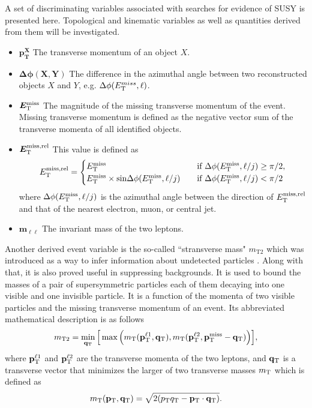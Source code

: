 A set of discriminating variables associated with searches for evidence of SUSY is presented here. Topological and kinematic variables as well as quantities derived from them will be investigated.

\begin{itemize}[leftmargin=0cm]
\item[]$\bm{p^X_T}$ The transverse momentum of an object $X$.
\item[]$\bm{\Delta\phi(X,Y)}$ The difference in the azimuthal angle between two reconstructed objects $X$ and $Y$, e.g. ${\Delta\phi(E_{\text T}^{miss},\ell)}$.
\item[]$\bm{E_{\text T}^{\text {miss}}}$ The magnitude of the missing transverse momentum of the event. Missing transverse momentum is defined as the negative vector sum of the transverse momenta of all identified objects.
\item[]$\bm{E^{\text{miss,rel}}_{\text T}}$ This value is defined as 
\[
 E_{\text T}^{\text {miss,rel}} = 
  \begin{cases} 
   E_{\text T}^{\text {miss}}\quad & \text{if } \Delta\phi(E_{\text T}^{\text {miss}},\ell/j) \geq \pi/2, \\
   E_{\text T}^{\text {miss}}\times \text{sin}\Delta\phi(E_{\text T}^{\text {miss}},\ell/j) \quad      & \text{if } \Delta\phi(E_{\text T}^{\text {miss}},\ell/j)<\pi/2
  \end{cases}
\]
where $\Delta\phi(E_{\text T}^{\text {miss}},\ell/j)$ is the azimuthal angle between the direction of $E_{\text T}^{\text {miss,rel}}$ and that of the nearest electron, muon, or central jet. 
\item[]$\bm{m_{\ell \ell}}$ The invariant mass of the two leptons.
\end{itemize}

Another derived event variable is the so-called ``stransverse mass"  $m_{\text {T2}}$ which was introduced as a way to infer information about undetected particles \citep{Lester:1999tx,Barr:2003rg}. Along with that, it is also proved useful in suppressing backgrounds. It is used to bound the masses of a pair of supersymmetric particles each of them decaying into one visible and one invisible particle. It is a function of the momenta of two visible particles and the missing transverse momentum of an event. Its abbreviated mathematical description is as follows
\begin{equation}
m_{\text{T2}} = \min_{\mathbf{q}_{\text T}}\Big [\max \Big ( m_{\text T} (\mathbf{p}_{\text T}^{\ell 1},\mathbf{q}_{\text T}),m_{\text T}(\mathbf{p}_{\text T}^{\ell 2},\mathbf{p}_{\text T}^{\text{miss}}-\mathbf{q}_{\text T}) \Big ) \Big ] ,
\end{equation}
where $\mathbf{p}_{\text T}^{\ell 1}$ and $\mathbf{p}_{\text T}^{\ell 2}$ are the transverse momenta of the two leptons, and $ \mathbf{q}_{\text T}$ is a transverse vector that minimizes the larger of two transverse masses $m_{\text T}$ which is defined as
\begin{equation}
m_{\text T}(\mathbf{p}_{\text T},\mathbf{q}_{\text T}) = \sqrt{2(p_{\text T}q_{\text T} - \mathbf{p}_{\text T} \cdot \mathbf{q}_{\text T})}.
\end{equation}

